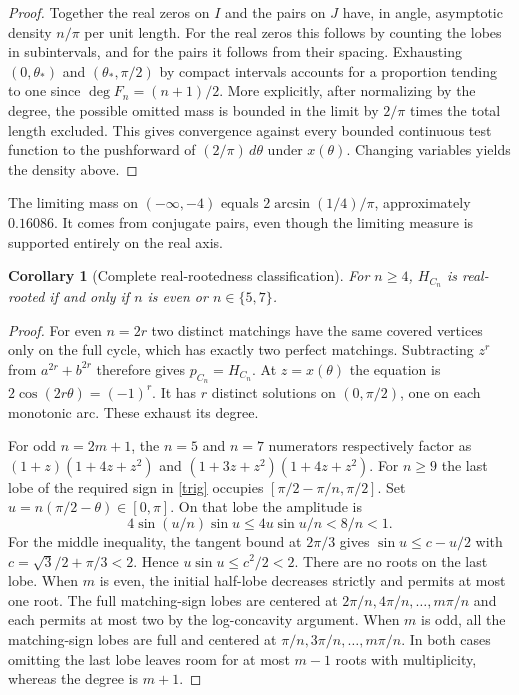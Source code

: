 \documentclass[11pt]{article}
\newtheorem{corollary}[theorem]{Corollary}
\begin{document}
\begin{proof}
Together the real zeros on $I$ and the pairs on $J$ have, in angle, asymptotic density $n/\pi$ per unit length. For the real zeros this follows by counting the lobes in subintervals, and for the pairs it follows from their spacing. Exhausting $(0,\theta_*)$ and $(\theta_*,\pi/2)$ by compact intervals accounts for a proportion tending to one since $\deg F_n=(n+1)/2$. More explicitly, after normalizing by the degree, the possible omitted mass is bounded in the limit by $2/\pi$ times the total length excluded. This gives convergence against every bounded continuous test function to the pushforward of $(2/\pi)\,d\theta$ under $x(\theta)$. Changing variables yields the density above.
\end{proof}
The limiting mass on $(-\infty,-4)$ equals $2\arcsin(1/4)/\pi$, approximately $0.16086$. It comes from conjugate pairs, even though the limiting measure is supported entirely on the real axis.

\begin{corollary}[Complete real-rootedness classification]
For $n\ge4$, $H_{C_n}$ is real-rooted if and only if $n$ is even or $n\in\{5,7\}$.
\end{corollary}
\begin{proof}
For even $n=2r$ two distinct matchings have the same covered vertices only on the full cycle, which has exactly two perfect matchings. Subtracting $z^r$ from $a^{2r}+b^{2r}$ therefore gives $p_{C_n}=H_{C_n}$. At $z=x(\theta)$ the equation is $2\cos(2r\theta)=(-1)^r$. It has $r$ distinct solutions on $(0,\pi/2)$, one on each monotonic arc. These exhaust its degree.

For odd $n=2m+1$, the $n=5$ and $n=7$ numerators respectively factor as $(1+z)(1+4z+z^2)$ and $(1+3z+z^2)(1+4z+z^2)$. For $n\ge9$ the last lobe of the required sign in \eqref{trig} occupies $[\pi/2-\pi/n,\pi/2]$. Set $u=n(\pi/2-\theta)\in[0,\pi]$. On that lobe the amplitude is
\[
 4\sin(u/n)\sin u\le 4u\sin u/n<8/n<1.
\]
For the middle inequality, the tangent bound at $2\pi/3$ gives $\sin u\le c-u/2$ with $c=\sqrt{3}/2+\pi/3<2$. Hence $u\sin u\le c^2/2<2$. There are no roots on the last lobe. When $m$ is even, the initial half-lobe decreases strictly and permits at most one root. The full matching-sign lobes are centered at $2\pi/n,4\pi/n,\ldots,m\pi/n$ and each permits at most two by the log-concavity argument. When $m$ is odd, all the matching-sign lobes are full and centered at $\pi/n,3\pi/n,\ldots,m\pi/n$. In both cases omitting the last lobe leaves room for at most $m-1$ roots with multiplicity, whereas the degree is $m+1$.
\end{proof}
\end{document}

